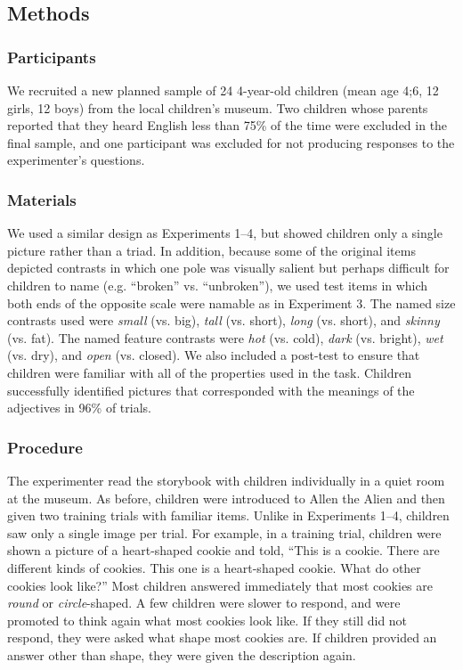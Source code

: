 \documentclass[man]{apa2}
\begin{document}
\subsection{Methods}

\subsubsection{Participants}

We recruited a new planned sample of 24 4-year-old children (mean age 4;6, 12 girls, 12 boys) from the local children's museum.  Two children whose parents reported that they heard English less than 75\% of the time were excluded in the final sample, and one participant was excluded for not producing responses to the experimenter's questions.

\subsubsection{Materials}

We used a similar design as Experiments 1--4, but showed children only a single picture rather than a triad.  In addition, because some of the original items depicted contrasts in which one pole was visually salient but perhaps difficult for children to name (e.g. ``broken'' vs. ``unbroken''), we used test items in which both ends of the opposite scale were namable as in Experiment 3. The named size contrasts used were \emph{small} (vs. big), \emph{tall} (vs. short), \emph{long} (vs. short), and \emph{skinny} (vs. fat).  The named feature contrasts were \emph{hot} (vs. cold), \emph{dark} (vs. bright), \emph{wet} (vs. dry), and \emph{open} (vs. closed).  We also included a post-test to ensure that children were familiar with all of the properties used in the task.  Children successfully identified pictures that corresponded with the meanings of the adjectives in 96\% of trials.

\subsubsection{Procedure}

The experimenter read the storybook with children individually in a quiet room at the museum. As before, children were introduced to Allen the Alien and then given two training trials with familiar items. Unlike in  Experiments 1--4, children saw only a single image per trial. For example, in a training trial, children were shown a picture of a heart-shaped cookie and told, ``This is a cookie.  There are different kinds of cookies.  This one is a heart-shaped cookie.  What do other cookies look like?'' Most children answered immediately that most cookies are \emph{round} or \emph{circle}-shaped. A few children were slower to respond, and were promoted to think again what most cookies look like. If they still did not respond, they were asked what shape most cookies are.  If children provided an answer other than shape, they were given the description again.
\end{document}
